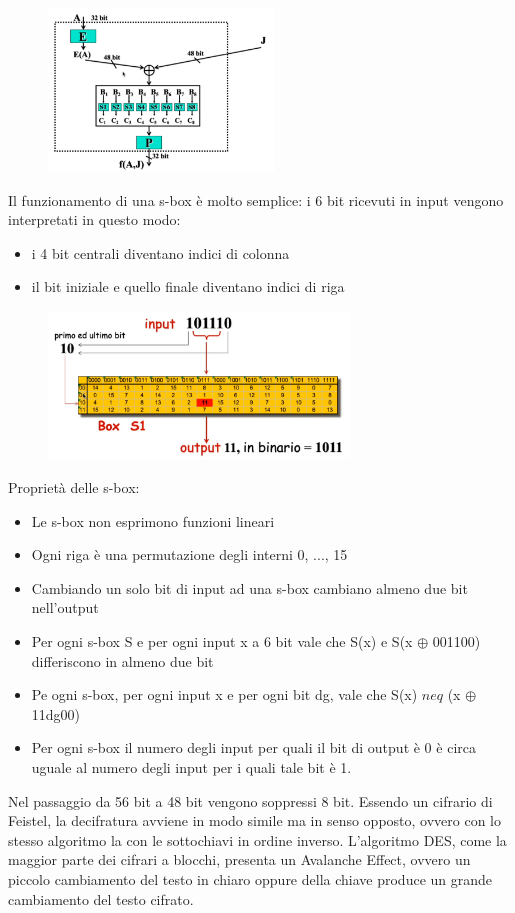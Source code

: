 \begin{figure}[htb!]
    \centering
    \includegraphics[width=6cm]{./Images/cap1/1.4.png}
\end{figure}

Il funzionamento di una s-box è molto semplice: i 6 bit ricevuti in input vengono interpretati in questo modo:
\begin{itemize}
    \item i 4 bit centrali diventano indici di colonna
    \item il bit iniziale e quello finale diventano indici di riga
\end{itemize}

\begin{figure}[htb!]
    \centering
    \includegraphics[width=8cm]{./Images/cap1/1.5.png}
\end{figure}

Proprietà delle s-box:
\begin{itemize}
    \item Le s-box non esprimono funzioni lineari
    \item Ogni riga è una permutazione degli interni 0, ..., 15
    \item Cambiando un solo bit di input ad una s-box cambiano almeno due bit nell'output
    \item Per ogni s-box S e per ogni input x a 6 bit vale che S(x) e S(x $\oplus$ 001100) differiscono in almeno due bit
    \item Pe ogni s-box, per ogni input x e per ogni bit dg, vale che S(x) $neq$ (x $\oplus$ 11dg00)
    \item Per ogni s-box il numero degli input per quali il bit di output è 0 è circa uguale al numero degli input per i quali tale bit è 1.
\end{itemize}
Nel passaggio da 56 bit a 48 bit vengono soppressi 8 bit. Essendo un cifrario di Feistel, la decifratura avviene in modo simile ma in senso opposto, ovvero con lo stesso algoritmo la con le sottochiavi in ordine inverso. L'algoritmo DES, come la maggior parte dei cifrari a blocchi, presenta un Avalanche Effect, ovvero un piccolo cambiamento del testo in chiaro oppure della chiave produce un grande cambiamento del testo cifrato.

